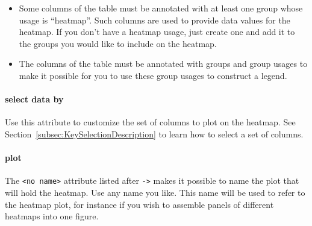 \begin{itemize}
  \item Some columns of the table must be annotated with at least one group whose usage is ``heatmap''. Such columns are used to provide data values for the heatmap. If you don't have a heatmap usage, just create one and add it to the groups you would like to include on the heatmap.
  \item The columns of the table must be annotated with groups and group usages to make it possible for you to use these group usages to construct a legend.
\end{itemize}

\paragraph{select data by}
Use this attribute to customize the set of columns to plot on the heatmap. See Section~\ref{subsec:KeySelectionDescription} to learn how to select a set of columns.

\paragraph{plot}
The \texttt{<no name>} attribute listed after \texttt{->} makes it possible to name the plot that will hold the heatmap. Use any name you like. This name will be used to refer to the heatmap plot, for instance if you wish to assemble panels of different heatmaps into one figure.


